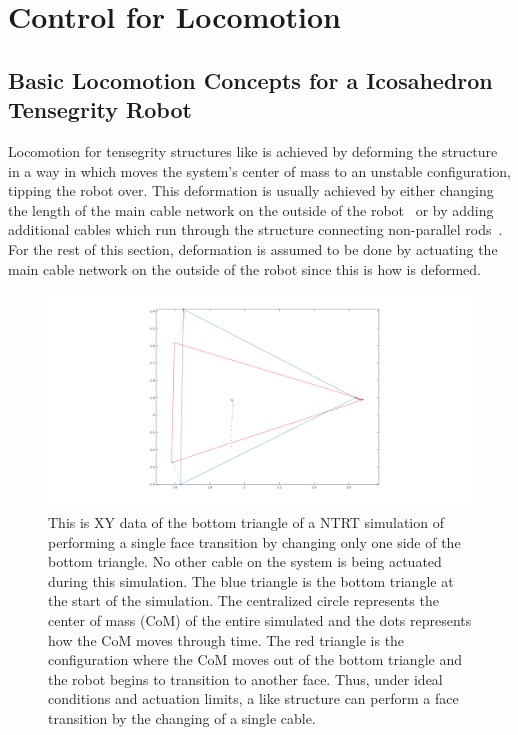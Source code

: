 \chapter{Control for \SB{} Locomotion}
\label{controls}

\section{Basic Locomotion Concepts for a Icosahedron Tensegrity Robot}
\label{basic_locomotion}

Locomotion for tensegrity structures like \SB{} is achieved by deforming the structure in a way in which moves the system's center of mass to an unstable configuration, tipping the robot over.
This deformation is usually achieved by either changing the length of the main cable network on the outside of the robot~\cite{sabelhaus2015system,kim2014rapid} or by adding additional cables which run through the structure connecting non-parallel rods~\cite{caluwaerts2014design}.
For the rest of this section, deformation is assumed to be done by actuating the main cable network on the outside of the robot since this is how \SB{} is deformed.

\begin{figure}[thpb]
      \centering
      \includegraphics[width=1\columnwidth]{tex/img/Single_flop_bottom_triangle}
      \caption{This is XY data of the bottom triangle of a NTRT simulation of \SB{} performing a single face transition by changing only one side of the bottom triangle.
      No other cable on the system is being actuated during this simulation.
      The blue triangle is the bottom triangle at the start of the simulation. 
      The centralized circle represents the center of mass (CoM) of the entire simulated \SB{} and the dots represents how the CoM moves through time. 
      The red triangle is the configuration where the CoM moves out of the bottom triangle and the robot begins to transition to another face.
      Thus, under ideal conditions and actuation limits, a \SB{} like structure can perform a face transition by the changing of a single cable.}
      \label{fig:single_flop}
\end{figure}

